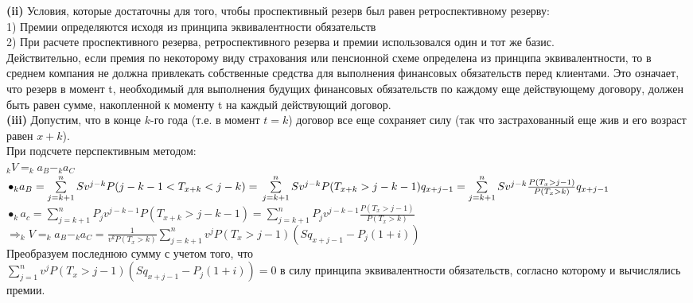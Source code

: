 \documentclass{article}
\begin{document}
  {\bf \large  (ii)} Условия, которые достаточны для того, чтобы проспективный резерв был равен ретроспективному резерву:\\
  1) Премии определяются исходя из принципа эквивалентности обязательств\\
  2) При расчете проспективного резерва, ретроспективного  резерва и премии использовался один и тот же базис.\\
 Действительно, если  премия по некоторому виду страхования или пенсионной схеме определена из принципа эквивалентности, то в среднем компания не должна 
 привлекать собственные средства для выполнения финансовых   обязательств перед клиентами. Это означает, что резерв в момент t, необходимый для выполнения 
 будущих финансовых обязательств по каждому еще действующему договору, должен быть равен сумме, накопленной к моменту t на каждый действующий договор.\\

 {\bf \large  (iii)} Допустим, что в конце $k$-го года (т.е. в момент $t = k$) договор все еще сохраняет силу (так что застрахованный еще жив и его возраст равен $x+k$).\\
 
При подсчете перспективным методом:\\
$_{k}V = _{k}a_{B} - _{k}a_{C}$\\

$ \bullet _{k}a_{B} = \sum\limits_{j=k+1}^{n}   Sv^{j-k}P(j-k-1 < T_{x+k} < j-k)  = \\
\sum\limits_{j=k+1}^{n}   Sv^{j-k}P(T_{x+k} > j-k-1) q_{x+j-1} =  \sum\limits_{j=k+1}^{n}   Sv^{j-k}  \frac {P(T_{x} >  j-1)}  { P(T_{x} > k)} q_{x+j-1}$\\

$ \bullet _{k}a_{c} = \sum\limits_{j=k+1}^{n}   P_{j} v^{j-k-1}P( T_{x+k} >  j-k-1)  =  \sum\limits_{j=k+1}^{n}   P_{j} v^{j-k-1}  \frac {P(T_{x} >  j-1)}  { P(T_{x} > k)} $\\

$\Rightarrow _{k}V = _{k}a_{B} - _{k}a_{C} = \frac{1}{v^{k}P(T_{x} >k) } \sum\limits_{j=k+1}^{n} v^{j}P(T_{x} > j-1) (Sq_{x+j-1} - P_{j}(1+i))$\\

Преобразуем последнюю сумму с учетом того, что \\
$ \sum\limits_{j=1}^{n} v^{j}P(T_{x} > j-1) (Sq_{x+j-1} - P_{j}(1+i)) = 0$ 
в силу принципа эквивалентности  обязательств, согласно которому и вычислялись премии.\\
\end{document}
